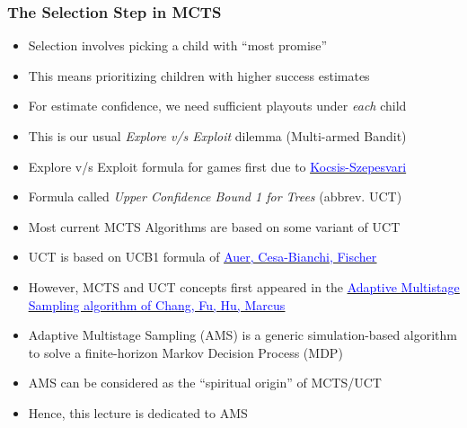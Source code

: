 \documentclass[handout]{beamer}
\begin{document}
\begin{frame}
\frametitle{The Selection Step in MCTS}
\begin{itemize}
\item Selection involves picking a child with ``most promise''
\item This means prioritizing children with higher success estimates
\item For estimate confidence, we need sufficient playouts under {\em each} child
\item This is our usual {\em Explore v/s Exploit} dilemma (Multi-armed Bandit)
\item Explore v/s Exploit formula for games first due to \href{http://ggp.stanford.edu/readings/uct.pdf}{\underline{\textcolor{blue}{Kocsis-Szepesvari}}}
\item Formula called {\em Upper Confidence Bound 1 for Trees} (abbrev. UCT)
\item Most current MCTS Algorithms are based on some variant of UCT
\item UCT is based on UCB1 formula of \href{https://homes.di.unimi.it/cesa-bianchi/Pubblicazioni/ml-02.pdf}{\underline{\textcolor{blue}{Auer, Cesa-Bianchi, Fischer}}}
\item However, MCTS and UCT concepts first appeared in the \href{https://pdfs.semanticscholar.org/a378/b2895a3e3f6a19cdff1a0ad404b301b5545f.pdf}{\underline{\textcolor{blue}{Adaptive Multistage Sampling algorithm of Chang, Fu, Hu, Marcus}}}
\item Adaptive Multistage Sampling (AMS) is a generic simulation-based algorithm to solve a finite-horizon Markov Decision Process (MDP)
\item AMS can be considered as the ``spiritual origin'' of MCTS/UCT
\item Hence, this lecture is dedicated to AMS
\end{itemize}
\end{frame}
\end{document}
